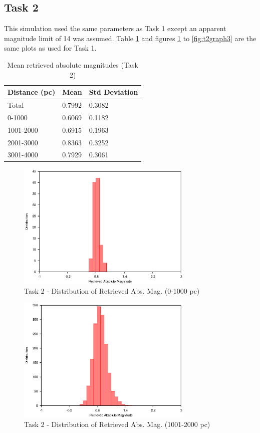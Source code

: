 \documentclass[a4paper,12pt]{article}
\begin{document}
\subsection{Task 2}
This simulation used the same parameters as Task 1 except an apparent magnitude limit of 14 was assumed. Table \ref{tab:task2} and figures \ref{fig:t2bin1} to \ref{fig:t2graph3} are the same plots as used for Task 1.
 
\begin{table}[ht]
\centering
\begin{tabular}{|l|l|l|}
\hline
Distance (pc) & Mean & Std Deviation \\
\hline
Total & 0.7992 & 0.3082 \\
0-1000 & 0.6069 & 0.1182 \\
1001-2000 & 0.6915 & 0.1963 \\
2001-3000 & 0.8363 & 0.3252 \\
3001-4000 & 0.7929 & 0.3061 \\
\hline
\end{tabular}
\caption{\label{tab:task2}Mean retrieved absolute magnitudes (Task 2)}
\end{table}

\begin{figure}[H]
\centering
\includegraphics[width=0.75\textwidth]{./Task2/Bin1}
\caption{Task 2 -  Distribution of Retrieved Abs. Mag. (0-1000 pc)}
\label{fig:t2bin1}
\end{figure}

\begin{figure}[H]
\centering
\includegraphics[width=0.75\textwidth]{./Task2/Bin2}
\caption{Task 2 - Distribution of Retrieved Abs. Mag. (1001-2000 pc)}
\label{fig:t2bin2}
\end{figure}
\end{document}
